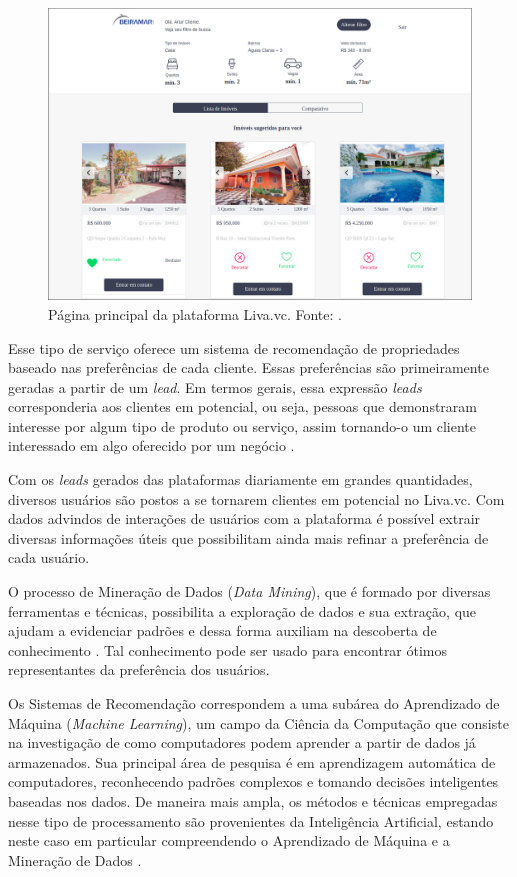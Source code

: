 \begin{figure}[H]
    \centering
    \includegraphics[scale=0.3]{figuras/introducao/pagina_principal_liva.png}
    \caption[Página principal da plataforma Liva.vc]{Página principal da plataforma Liva.vc. Fonte: \cite{Liva:2019}.}
    \label{fig:pagina_principal_liva}
\end{figure}


Esse tipo de serviço oferece um sistema de recomendação de propriedades baseado nas preferências de cada cliente. Essas preferências são primeiramente geradas a partir de um \textit{lead}. Em termos gerais, essa expressão \textit{leads} corresponderia aos clientes em potencial, ou seja, pessoas que demonstraram interesse por algum tipo de produto ou serviço, assim tornando-o um cliente interessado em algo oferecido por um negócio \cite{Agenciakaizen:2019}.

Com os \textit{leads} gerados das plataformas diariamente em grandes quantidades, diversos usuários são postos a se tornarem clientes em potencial no Liva.vc. Com dados advindos de interações de usuários com a plataforma é possível extrair diversas informações úteis que possibilitam ainda mais refinar a preferência de cada usuário.

O processo de Mineração de Dados (\textit{Data Mining}), que é formado por diversas ferramentas e técnicas, possibilita a exploração de dados e sua extração, que ajudam a evidenciar padrões e dessa forma auxiliam na descoberta de conhecimento \cite{Han:2011:DMC:1972541}. Tal conhecimento pode ser usado para encontrar ótimos representantes da preferência dos usuários.

Os Sistemas de Recomendação correspondem a uma subárea do Aprendizado de Máquina (\textit{Machine Learning}), um campo da Ciência da Computação que consiste na investigação de como computadores podem aprender a partir de dados já armazenados. Sua principal área de pesquisa é em aprendizagem automática de computadores, reconhecendo padrões complexos e tomando decisões inteligentes baseadas nos dados. De maneira mais ampla, os métodos e técnicas empregadas nesse tipo de processamento são provenientes da Inteligência Artificial, estando neste caso em particular compreendendo o Aprendizado de Máquina e a Mineração de Dados \cite{Han:2011:DMC:1972541}.


